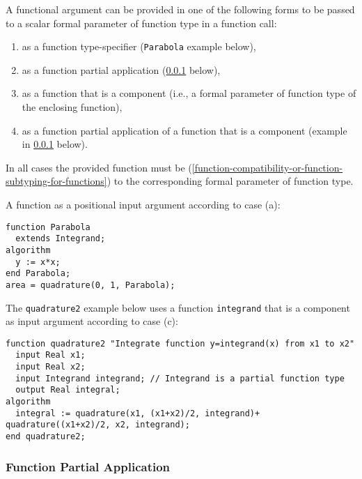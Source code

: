 A functional argument can be provided in one of the following forms to
be passed to a scalar formal parameter of function type in a function
call:
\begin{enumerate}
\def\labelenumi{\alph{enumi})}
\item
  as a function type-specifier (\lstinline!Parabola! example below),
\item
  as a function partial application (\cref{function-partial-application} below),
\item
  as a function that is a component (i.e., a formal parameter of function type of the enclosing function),
\item
  as a function partial application of a function that is a component
  (example in \cref{function-partial-application} below).
\end{enumerate}

In all cases the provided function must be 
(\cref{function-compatibility-or-function-subtyping-for-functions}) to the corresponding formal parameter of function type.

\begin{example}
A function as a positional input argument according to case (a):
\begin{lstlisting}[language=modelica]
function Parabola
  extends Integrand;
algorithm
  y := x*x;
end Parabola;
area = quadrature(0, 1, Parabola);
\end{lstlisting}
The \lstinline!quadrature2! example below uses a function \lstinline!integrand! that is a
component as input argument according to case (c):
\begin{lstlisting}[language=modelica]
function quadrature2 "Integrate function y=integrand(x) from x1 to x2"
  input Real x1;
  input Real x2;
  input Integrand integrand; // Integrand is a partial function type
  output Real integral;
algorithm
  integral := quadrature(x1, (x1+x2)/2, integrand)+  quadrature((x1+x2)/2, x2, integrand);
end quadrature2;
\end{lstlisting}
\end{example}

\subsubsection{Function Partial Application}\label{function-partial-application}

